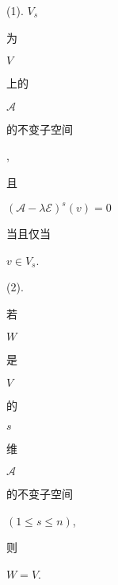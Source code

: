 \documentclass[10pt]{article}
\begin{document}
(1). $V_{s}$ \begin{CJK}{UTF8}{mj}为\end{CJK} $V$ \begin{CJK}{UTF8}{mj}上的\end{CJK} $\mathscr{A}$ \begin{CJK}{UTF8}{mj}的不变子空间\end{CJK}, \begin{CJK}{UTF8}{mj}且\end{CJK} $(\mathscr{A}-\lambda \mathscr{E})^{s}(v)=0$ \begin{CJK}{UTF8}{mj}当且仅当\end{CJK} $v \in V_{s}$.

(2). \begin{CJK}{UTF8}{mj}若\end{CJK} $W$ \begin{CJK}{UTF8}{mj}是\end{CJK} $V$ \begin{CJK}{UTF8}{mj}的\end{CJK} $s$ \begin{CJK}{UTF8}{mj}维\end{CJK} $\mathscr{A}$ \begin{CJK}{UTF8}{mj}的不变子空间\end{CJK} $(1 \leq s \leq n)$, \begin{CJK}{UTF8}{mj}则\end{CJK} $W=V$.
\end{document}
